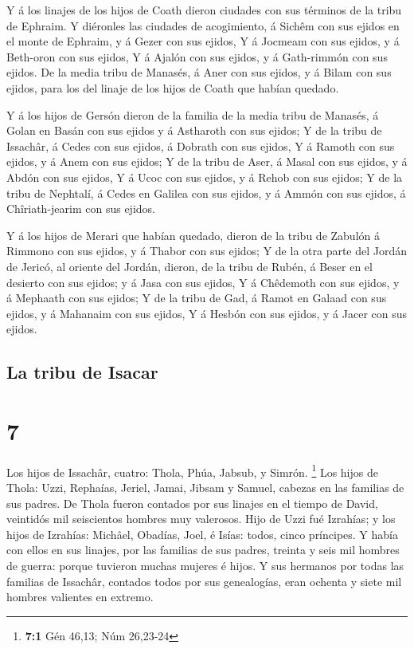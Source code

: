  Y á los linajes de los hijos de Coath dieron ciudades con
sus términos de la tribu de Ephraim.  Y diéronles las
ciudades de acogimiento, á Sichêm con sus ejidos en el monte de Ephraim,
y á Gezer con sus ejidos,  Y á Jocmeam con sus ejidos, y á
Beth-oron con sus ejidos,  Y á Ajalón con sus ejidos, y á
Gath-rimmón con sus ejidos.  De la media tribu de Manasés,
á Aner con sus ejidos, y á Bilam con sus ejidos, para los del linaje de
los hijos de Coath que habían quedado.

 Y á los hijos de Gersón dieron de la familia de la media
tribu de Manasés, á Golan en Basán con sus ejidos y á Astharoth con sus
ejidos;  Y de la tribu de Issachâr, á Cedes con sus ejidos,
á Dobrath con sus ejidos,  Y á Ramoth con sus ejidos, y á
Anem con sus ejidos;  Y de la tribu de Aser, á Masal con
sus ejidos, y á Abdón con sus ejidos,  Y á Ucoc con sus
ejidos, y á Rehob con sus ejidos;  Y de la tribu de
Nephtalí, á Cedes en Galilea con sus ejidos, y á Ammón con sus ejidos, á
Chîriath-jearim con sus ejidos.

 Y á los hijos de Merari que habían quedado, dieron de la
tribu de Zabulón á Rimmono con sus ejidos, y á Thabor con sus ejidos;
 Y de la otra parte del Jordán de Jericó, al oriente del
Jordán, dieron, de la tribu de Rubén, á Beser en el desierto con sus
ejidos; y á Jasa con sus ejidos,  Y á Chêdemoth con sus
ejidos, y á Mephaath con sus ejidos;  Y de la tribu de Gad,
á Ramot en Galaad con sus ejidos, y á Mahanaim con sus ejidos,
 Y á Hesbón con sus ejidos, y á Jacer con sus ejidos.

\hypertarget{la-tribu-de-isacar}{%
\subsection{La tribu de Isacar}\label{la-tribu-de-isacar}}

\hypertarget{section-6}{%
\section{7}\label{section-6}}

 Los hijos de Issachâr, cuatro: Thola, Phúa, Jabsub, y
Simrón. \footnote{\textbf{7:1} Gén 46,13; Núm 26,23-24}  Los
hijos de Thola: Uzzi, Rephaías, Jeriel, Jamai, Jibsam y Samuel, cabezas
en las familias de sus padres. De Thola fueron contados por sus linajes
en el tiempo de David, veintidós mil seiscientos hombres muy valerosos.
 Hijo de Uzzi fué Izrahías; y los hijos de Izrahías:
Michâel, Obadías, Joel, é Isías: todos, cinco príncipes.  Y
había con ellos en sus linajes, por las familias de sus padres, treinta
y seis mil hombres de guerra: porque tuvieron muchas mujeres é hijos.
 Y sus hermanos por todas las familias de Issachâr, contados
todos por sus genealogías, eran ochenta y siete mil hombres valientes en
extremo.

